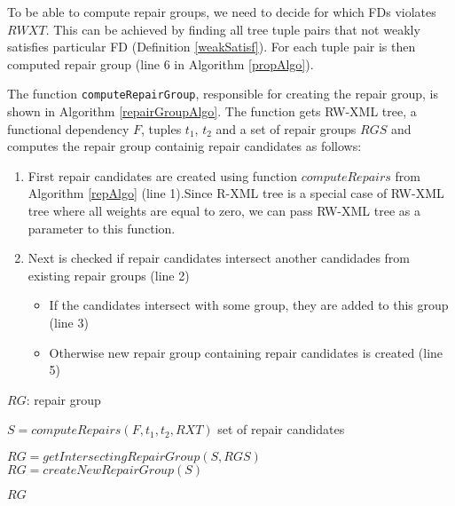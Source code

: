 To be able to compute repair groups, we need to decide for which FDs violates $RWXT$. This can be achieved by finding all tree tuple pairs that not weakly satisfies particular FD (Definition \ref{weakSatisf}). For each tuple pair is then computed repair group (line 6 in Algorithm \ref{propAlgo}).

The function \texttt{computeRepairGroup}, responsible for creating the repair group, is shown in Algorithm \ref{repairGroupAlgo}. The function gets RW-XML tree, a functional dependency $F$, tuples $t_1$, $t_2$ and a set of repair groups $RGS$ and computes the repair group containig repair candidates as follows:

\begin{enumerate}
	\item First repair candidates are created using function $computeRepairs$ from Algorithm \ref{repAlgo} (line 1).Since R-XML tree is a special case of RW-XML tree where all weights are equal to zero, we can pass RW-XML tree as a parameter to this function.
    \item Next is checked if repair candidates intersect another candidades from existing repair groups (line 2)
    \begin{itemize}
    	\item If the candidates intersect with some group, they are added to this group (line 3)
        \item Otherwise new repair group containing repair candidates is created (line 5)
    \end{itemize}
\end{enumerate}

\begin{algorithm}
\caption{$computeRepairGroup(F, t_1, t_2, RXT, RGS)$}
\label{repairGroupAlgo}
\begin{algorithmic}[1]
\ENSURE $RG$: repair group

\STATE $S = computeRepairs(F, t_1, t_2, RXT)$ \COMMENT set of repair candidates

\STATE $RG = getIntersectingRepairGroup(S, RGS)$
\ELSE
\STATE $RG = createNewRepairGroup(S)$
\ENDIF

\RETURN $RG$
\end{algorithmic}
\end{algorithm}

